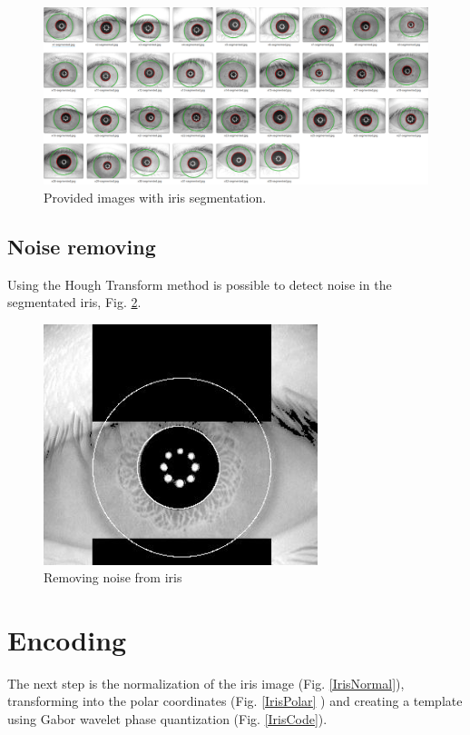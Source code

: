 \documentclass{article}
\begin{document}
\newpage

\begin{figure}[ht!]
  \includegraphics[width=180mm]{Resources/all-segmented.png}
  \caption{Provided images with iris segmentation.}
  \label{AllSegmented}
\end{figure}




\subsection{Noise removing}
Using the Hough Transform method is possible to detect noise in the segmentated iris, Fig. \ref{ImgNoise}.

\begin{figure}[ht!]
  \centering
  \includegraphics[width=80mm]{Resources/eye-noise.jpg}
  \caption{Removing noise from iris}
  \label{ImgNoise}
\end{figure}

\newpage

\section{Encoding}
The next step is the normalization of the iris image (Fig. \ref{IrisNormal}), transforming into the polar coordinates (Fig. \ref{IrisPolar} ) and creating a template 
using Gabor wavelet phase quantization (Fig. \ref{IrisCode}). 
\end{document}
